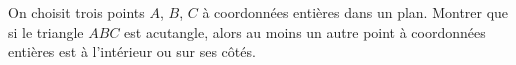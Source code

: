 On choisit trois points $A$, $B$, $C$ à coordonnées entières dans un plan. Montrer que si le triangle $ABC$ est acutangle, alors au moins un autre point à coordonnées entières est à l'intérieur ou sur ses côtés.
